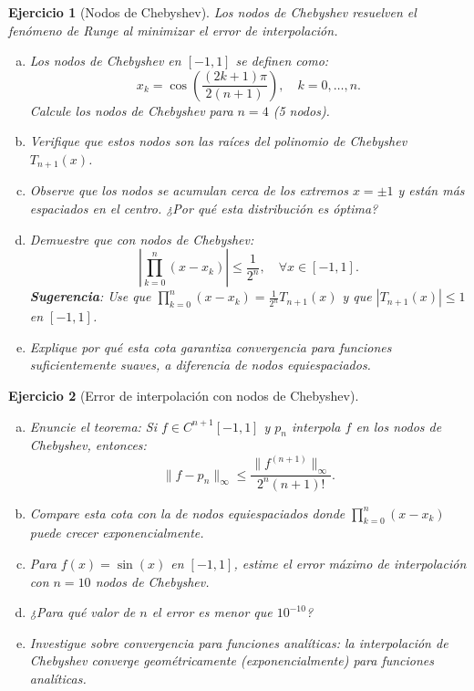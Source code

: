 \documentclass[12pt]{article}
\newtheorem{exercise}{Ejercicio}
\begin{document}
\begin{exercise}[Nodos de Chebyshev]
Los nodos de Chebyshev resuelven el fenómeno de Runge al minimizar el error de interpolación.
\begin{enumerate}[(a)]
\item Los nodos de Chebyshev en $[-1, 1]$ se definen como:
\[
x_k = \cos\left(\frac{(2k+1)\pi}{2(n+1)}\right), \quad k = 0, \ldots, n.
\]
Calcule los nodos de Chebyshev para $n = 4$ (5 nodos).
\item Verifique que estos nodos son las raíces del polinomio de Chebyshev $T_{n+1}(x)$.
\item Observe que los nodos se acumulan cerca de los extremos $x = \pm 1$ y están más espaciados en el centro. ¿Por qué esta distribución es óptima?
\item Demuestre que con nodos de Chebyshev:
\[
\left|\prod_{k=0}^n (x - x_k)\right| \leq \frac{1}{2^n}, \quad \forall x \in [-1, 1].
\]
\textbf{Sugerencia}: Use que $\prod_{k=0}^n (x - x_k) = \frac{1}{2^n} T_{n+1}(x)$ y que $|T_{n+1}(x)| \leq 1$ en $[-1,1]$.
\item Explique por qué esta cota garantiza convergencia para funciones suficientemente suaves, a diferencia de nodos equiespaciados.
\end{enumerate}
\end{exercise}

\begin{exercise}[Error de interpolación con nodos de Chebyshev]
\begin{enumerate}[(a)]
\item Enuncie el teorema: Si $f \in C^{n+1}[-1,1]$ y $p_n$ interpola $f$ en los nodos de Chebyshev, entonces:
\[
\|f - p_n\|_\infty \leq \frac{\|f^{(n+1)}\|_\infty}{2^n (n+1)!}.
\]
\item Compare esta cota con la de nodos equiespaciados donde $\prod_{k=0}^n (x - x_k)$ puede crecer exponencialmente.
\item Para $f(x) = \sin(x)$ en $[-1, 1]$, estime el error máximo de interpolación con $n = 10$ nodos de Chebyshev.
\item ¿Para qué valor de $n$ el error es menor que $10^{-10}$?
\item Investigue sobre convergencia para funciones analíticas: la interpolación de Chebyshev converge geométricamente (exponencialmente) para funciones analíticas.
\end{enumerate}
\end{exercise}
\end{document}
